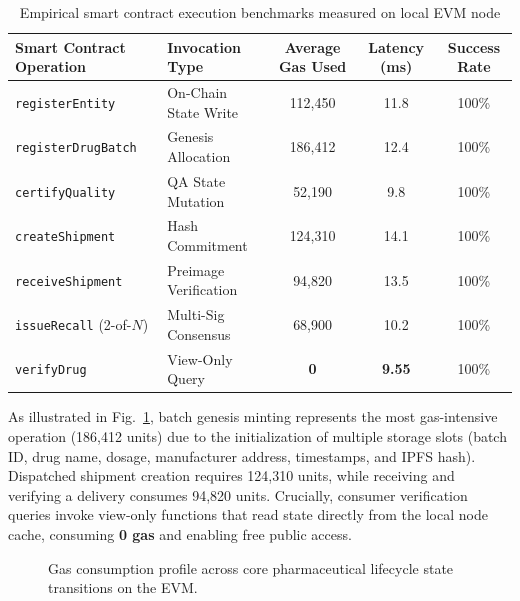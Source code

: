 \documentclass[pdflatex,sn-mathphys-num]{sn-jnl}
\theoremstyle{thmstyleone}
\theoremstyle{thmstyletwo}
\theoremstyle{thmstylethree}
\begin{document}
\begin{table}[htbp]
\centering
\caption{Empirical smart contract execution benchmarks measured on local EVM node}
\label{tab:gas-latency-benchmarks}
\vspace{0.5em}
\begin{tabular}{llccc}
\toprule
\textbf{Smart Contract Operation} & \textbf{Invocation Type} & \textbf{Average Gas Used} & \textbf{Latency (ms)} & \textbf{Success Rate} \\
\midrule
\texttt{registerEntity} & On-Chain State Write & 112,450 & 11.8 & 100\% \\
\texttt{registerDrugBatch} & Genesis Allocation & 186,412 & 12.4 & 100\% \\
\texttt{certifyQuality} & QA State Mutation & 52,190 & 9.8 & 100\% \\
\texttt{createShipment} & Hash Commitment & 124,310 & 14.1 & 100\% \\
\texttt{receiveShipment} & Preimage Verification & 94,820 & 13.5 & 100\% \\
\texttt{issueRecall} (2-of-$N$) & Multi-Sig Consensus & 68,900 & 10.2 & 100\% \\
\texttt{verifyDrug} & View-Only Query & \textbf{0} & \textbf{9.55} & 100\% \\
\bottomrule
\end{tabular}
\end{table}

As illustrated in Fig.~\ref{fig:gas-benchmark}, batch genesis minting represents the most gas-intensive operation (186,412 units) due to the initialization of multiple storage slots (batch ID, drug name, dosage, manufacturer address, timestamps, and IPFS hash). Dispatched shipment creation requires 124,310 units, while receiving and verifying a delivery consumes 94,820 units. Crucially, consumer verification queries invoke view-only functions that read state directly from the local node cache, consuming \textbf{0 gas} and enabling free public access.

\begin{figure}[htbp]
\centering
{}
\caption{Gas consumption profile across core pharmaceutical lifecycle state transitions on the EVM.}
\label{fig:gas-benchmark}
\end{figure}
\end{document}
